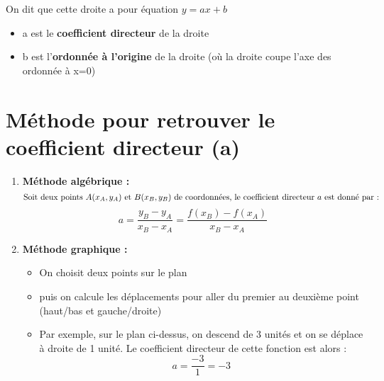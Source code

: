 \documentclass{article}
\begin{document}
\begin{center}
\end{center}

On dit que cette droite a pour équation \(y = ax + b\)
\begin{itemize}
    \item a est le \textbf{coefficient directeur} de la droite 
    \item b est l'\textbf{ordonnée à l'origine} de la droite (où la droite coupe l'axe des ordonnée à x=0)
\end{itemize}

\newpage
\section{\textbf{Méthode pour retrouver le coefficient directeur (a)}}

\begin{enumerate}
    \item \textbf{Méthode algébrique :} 
    \[
    \text{Soit deux points \( A(x_A, y_A) \) et \( B(x_B, y_B) \) de coordonnées, le coefficient directeur \( a \) est donné par :}
    \]
    \[
    a = \frac{y_B - y_A}{x_B - x_A} = \frac{f(x_B) - f(x_A)}{x_B - x_A}
    \]

    \item \textbf{Méthode graphique :} 
    \begin{itemize}
        \item On choisit deux points sur le plan
        \item puis on calcule les déplacements pour aller du premier au deuxième point (haut/bas et gauche/droite)
        \item Par exemple, sur le plan ci-dessus, on descend de 3 unités et on se déplace à droite de 1 unité. Le coefficient directeur de cette fonction est alors :
        \[
        a = \frac{-3}{1} = -3
        \]
    \end{itemize}
\end{enumerate}
\end{document}
